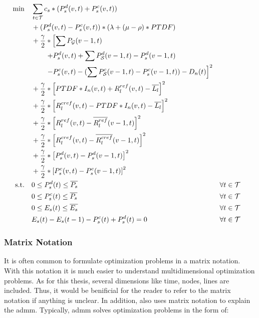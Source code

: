  \begin{subequations}
	\begin{align}
		 \min \quad & \sum_{t\in\mathcal{T}} c_s*(P_s^d(v, t) + P_s^c(v, t))\label{eq:sub:stor}\\
		 & + (P_s^d(v, t) - P_s^c(v, t)) * (\lambda + (\mu - \rho) * PTDF) \nonumber \\ 
		 & + \frac{\gamma}{2} * \left[\sum P_{\mathcal{G}}(v-1,t) \right. \nonumber \\ 
		 & \qquad \left. + P_s^d(v, t) + \sum P_{\mathcal{S}}^d(v-1, t) - P_s^d(v-1, t) \right. \nonumber \\
		 & \qquad \left. - P_s^c(v, t) - (\sum P_{\mathcal{S}}^c(v-1, t) -  P_s^c(v-1, t)) - D_n(t)\right]^2 \nonumber \\
		 & + \frac{\gamma}{2} * \left[PTDF * I_n(v, t) + R^{ref}_l(v, t) - \overline{L_l}\right]^2 \nonumber \\
		 & + \frac{\gamma}{2} * \left[R^{cref}_l(v, t) - PTDF * I_n(v, t) - \overline{L_l}\right]^2\nonumber \\
		 & + \frac{\gamma}{2} * \left[R^{ref}_l(v, t) - \overline{R^{ref}_l}(v-1, t)  \right]^2 \nonumber\\
		 & + \frac{\gamma}{2} * \left[R^{cref}_l(v, t) - \overline{R^{cref}_l}(v-1, t)  \right]^2 \nonumber \\
		 & + \frac{\gamma}{2} * \left[P_s^d(v, t) - P_s^d(v-1, t)\right]^2 \nonumber \\
		 & + \frac{\gamma}{2} * \left[P_s^c(v, t) - P_s^c(v-1, t)\right]^2 \nonumber \\
		 \text{s.t.} \quad & 0 \leq P_s^d(t) \leq \overline{P_s} && \forall t \in \mathcal{T} \\
		 & 0 \leq P_s^c(t) \leq \overline{P_s} && \forall t \in \mathcal{T}\\
		 & 0 \leq E_s(t) \leq \overline{E_s} && \forall t \in \mathcal{T}\\
		 & E_s(t) - E_s(t-1) - P_s^c(t) + P_s^d(t) = 0 && \forall t \in \mathcal{T}
	\end{align}
\end{subequations}

\subsubsection{Matrix Notation}
\label{sec:app:matrix}

It is often common to formulate optimization problems in a matrix notation. With this notation it is much easier to understand multidimensional optimization problems. As for this thesis, several dimensions like time, nodes, lines are included. Thus, it would be benificial for the reader to refer to the matrix notation if anything is unclear. In addition, \citet{boyd2010} also uses matrix notation to explain the \gls{admm}. Typically, \gls{admm} solves optimization problems in the form of:

